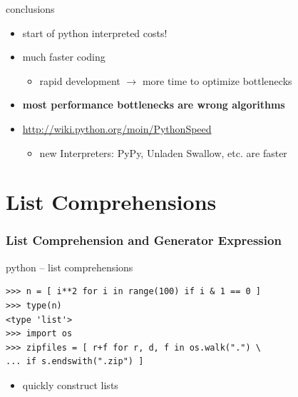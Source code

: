 \documentclass{beamer}
\begin{document}
\begin{frame}
    \begin{alertblock}{conclusions}
    \begin{itemize}
        \item start of python interpreted costs! %
        \item much faster coding
        \begin{itemize}
        	\item rapid development $\rightarrow$ more time to optimize bottlenecks
        \end{itemize}
        \item \textbf{most performance bottlenecks are wrong algorithms}
        \item \url{http://wiki.python.org/moin/PythonSpeed}
        \begin{itemize}
        	\item new Interpreters: PyPy, Unladen Swallow, etc. are faster
        \end{itemize}
    \end{itemize}
    \end{alertblock}
\end{frame}

\section{List Comprehensions}	%

\begin{frame}
	\frametitle{List Comprehension and Generator Expression}
	\begin{exampleblock}{python -- list comprehensions}
	\begin{lstlisting}
>>> n = [ i**2 for i in range(100) if i & 1 == 0 ]
>>> type(n)
<type 'list'>
>>> import os
>>> zipfiles = [ r+f for r, d, f in os.walk(".") \
... if s.endswith(".zip") ]
	\end{lstlisting}
	\end{exampleblock}
	
	\begin{itemize}
		\item quickly construct lists
	\end{itemize}

\end{frame}
\end{document}
